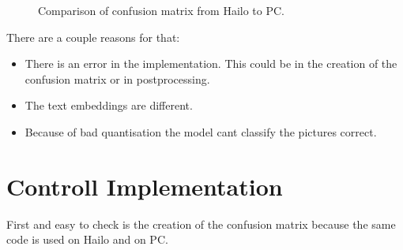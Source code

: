 \begin{figure}[!h]
    \centering
    \label{methods:fig:compareConfM}
    \caption{Comparison of confusion matrix from Hailo to PC.}
\end{figure}

There are a couple reasons for that:
\begin{itemize}
    \item There is an error in the implementation. This could be in the creation of the confusion matrix or in postprocessing.
    \item The text embeddings are different.
    \item Because of bad quantisation the model cant classify the pictures correct.
\end{itemize}

\section{Controll Implementation
    \label{scetion:methods:contimp}}
First and easy to check is the creation of the confusion matrix because the same code is used on Hailo and on PC.

